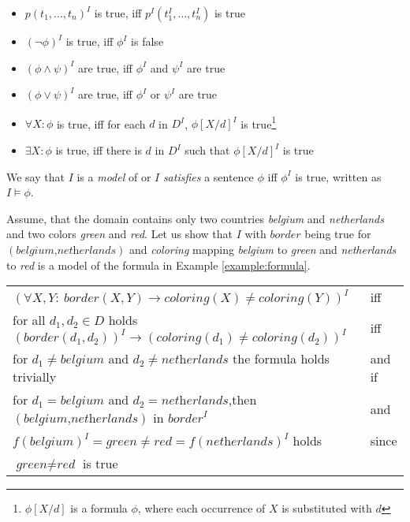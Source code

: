 \begin{itemize}
  \item $p(t_1,\dots,t_n)^I$ is true, iff $p^I(t_1^I,\dots,t_n^I)$ is true
  \item $(\lnot \phi)^I$ is true, iff $\phi^I$ is false
  \item $(\phi \wedge \psi)^I$ are true, iff $\phi^I$ and $\psi^I$ are true
  \item $(\phi \vee \psi)^I$ are true, iff $\phi^I$ or $\psi^I$ are true
  \item $\forall X: \phi$ is true, iff for each $d$ in $D^I$, $\phi[X/d]^I$ is true\footnote{$\phi[X/d]$ is a formula $\phi$, where each occurrence of $X$ is substituted with $d$}
  \item $\exists X: \phi$ is true, iff there is $d$ in $D^I$ such that $\phi[X/d]^I$ is true
\end{itemize}

We say that $I$ is a \textit{model} of or $I$ \textit{satisfies} a sentence $\phi$ iff $\phi^I$ is true, written as $I \models \phi$.

\begin{example}
  Assume, that the domain contains only two countries \textit{belgium} and \textit{netherlands} and two colors \textit{green} and \textit{red}. Let us show that $I$ with $\textit{border}$ being true for $(\textit{belgium,netherlands})$ and \textit{coloring} mapping \textit{belgium} to \textit{green} and \textit{netherlands} to \textit{red} is a model of the formula in Example \ref{example:formula}.

  \begin{tabular}{l l}
$(\forall X,Y{:}~\textit{border}(X,Y) \rightarrow \textit{coloring}(X) \neq \textit{coloring}(Y))^I$ & iff \\
for all $d_1,d_2 \in D$ holds $(\textit{border}(d_1,d_2))^I \rightarrow (\textit{coloring}(d_1) \neq \textit{coloring}(d_2))^I$ & iff \\
for $d_1 \neq \textit{belgium}$ and $d_2 \neq \textit{netherlands}$  the formula holds trivially & and if\\
for $d_1  = \textit{belgium}$ and $d_2 = \textit{netherlands}$,then $(\textit{belgium,netherlands})$ in $\textit{border}^I$ & and\\ 
      $f(\textit{belgium})^I = \textit{green} \neq \textit{red} = f(\textit{netherlands})^I$ holds & since \\
$\textit{green} \neq \textit{red}$  is true &
  \end{tabular}
\end{example}


